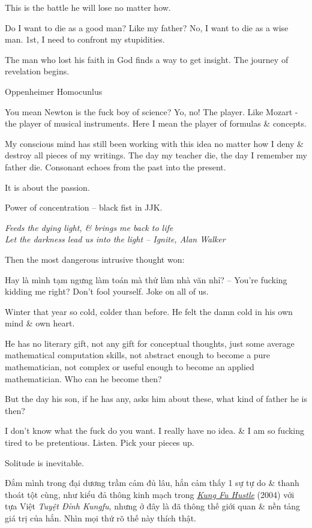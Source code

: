\documentclass[12pt]{article}
\begin{document}
This is the battle he will lose no matter how.

Do I want to die as a good man? Like my father? No, I want to die as a wise man. 1st, I need to confront my stupidities.

The man who lost his faith in God finds a way to get insight. The journey of revelation begins.

\cite{Tolle2022}

Oppenheimer Homocunlus

You mean Newton is the fuck boy of science? Yo, no! The player. Like Mozart - the player of musical instruments. Here I mean the player of formulas \& concepts.

My conscious mind has still been working with this idea no matter how I deny \& destroy all pieces of my writings. The day my teacher die, the day I remember my father die. Consonant echoes from the past into the present. 

It is about the passion.

Power of concentration -- black fist in JJK.

\begin{center}\it
	Feeds the dying light, \& brings me back to life\\
	Let the darkness lead us into the light 
	-- Ignite, {\sc Alan Walker}
\end{center}
Then the most dangerous intrusive thought won:

Hay là mình tạm ngưng làm toán mà thử làm nhà văn nhỉ? -- You're fucking kidding me right? Don't fool yourself. Joke on all of us.

Winter that year so cold, colder than before. He felt the damn cold in his own mind \& own heart.

He has no literary gift, not any gift for conceptual thoughts, just some average mathematical computation skills, not abstract enough to become a pure mathematician, not complex or useful enough to become an applied mathematician. Who can he become then?

But the day his son, if he has any, asks him about these, what kind of father he is then?

I don't know what the fuck do you want. I really have no idea. \& I am so fucking tired to be pretentious. Listen. Pick your pieces up.

Solitude is inevitable.

Đắm mình trong đại dương trầm cảm đủ lâu, hắn cảm thấy 1 sự tự do \& thanh thoát tột cùng, như kiểu đả thông kinh mạch trong \href{https://www.imdb.com/title/tt0373074/}{\it Kung Fu Hustle} (2004) với tựa Việt {\it Tuyệt Đỉnh Kungfu}, nhưng ở đây là đã thông thế giới quan \& nền tảng giá trị của hắn. Nhìn mọi thứ rõ thế này thích thật.
\end{document}
